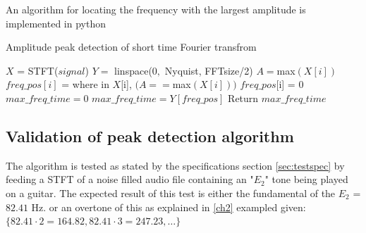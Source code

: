 An algorithm for locating the frequency with the largest amplitude is implemented in python 
\begin{algorithm}[H]
\caption{Amplitude peak detection of short time Fourier transfrom}
\label{alg:FIR}
\begin{algorithmic}[1] 
\State  $X$ = STFT($signal$) 
\State $Y =$ linspace($0,$ Nyquist, FFTsize/2) 
		\State $A = $max$(X[i])$ 
		 
			\State $freq\_pos[i]$ = where in $X$[i], $(A == $max$(X[i]))$ 
		\Else
			\State $freq\_pos$[i] = 0	
		\EndIf
			\State $max\_freq\_time = 0$
		\Else
			\State $max\_freq\_time = Y[freq\_pos]$
		\EndIf
	\EndFor
	\State Return $max\_freq\_time$
\EndProcedure
\end{algorithmic}
\end{algorithm}

\subsection{Validation of peak detection algorithm}
The algorithm is tested as stated by the specifications section \ref{sec:testspec} by feeding a STFT of a noise filled audio file containing an "$E_2$" tone being played on a guitar. 
The expected result of this test is either the fundamental of the $E_2$ = $82.41$ Hz. or an overtone of this as explained in \ref{ch2} exampled given: $\{82.41 \cdot 2 = 164.82, 82.41 \cdot 3 = 247.23, \dots \}$ 

